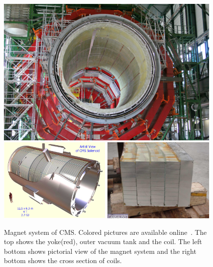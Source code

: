 %
\begin{figure}[h] 
\vspace{1cm}
\includegraphics[width=0.99\textwidth]{figures/Figure_CP-1.jpg} \\
\includegraphics[width=0.49\textwidth]{figures/CMS-solenoid-magnet.jpg} 
\includegraphics[width=0.49\textwidth]{figures/magnet-2000-049.jpg}
\caption{Magnet system of CMS. Colored pictures are available online~\cite{cmstdr1}. 
The top shows the yoke(red), outer vacuum tank and the coil. The left bottom 
shows pictorial view of the magnet system and the right bottom  shows 
the cross section of coils.}
\label{fig:magnet} 
\end{figure} 



